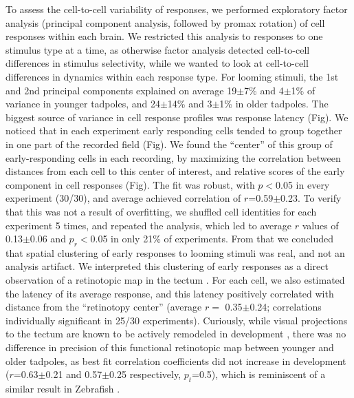 \documentclass{article}
\begin{document}
To assess the cell-to-cell variability of responses, we performed exploratory factor analysis (principal component analysis, followed by promax rotation) of cell responses within each brain. We restricted this analysis to responses to one stimulus type at a time, as otherwise factor analysis detected cell-to-cell differences in stimulus selectivity, while we wanted to look at cell-to-cell differences in dynamics within each response type. For looming stimuli, the 1st and 2nd principal components explained on average 19$\pm$7\% and 4$\pm$1\% of variance in younger tadpoles, and 24$\pm$14\% and 3$\pm$1\% in older tadpoles. The biggest source of variance in cell response profiles was response latency (Fig). We noticed that in each experiment early responding cells tended to group together in one part of the recorded field (Fig). We found the “center” of this group of early-responding cells in each recording, by maximizing the correlation between distances from each cell to this center of interest, and relative scores of the early component in cell responses (Fig). The fit was robust, with $p<$0.05 in every experiment (30/30), and average achieved correlation of $r$=0.59$\pm$0.23. To verify that this was not a result of overfitting, we shuffled cell identities for each experiment 5 times, and repeated the analysis, which led to average $r$ values of 0.13$\pm$0.06 and $p_r<$0.05 in only 21\% of experiments. From that we concluded that spatial clustering of early responses to looming stimuli was real, and not an analysis artifact. We interpreted this clustering of early responses as a direct observation of a retinotopic map in the tectum \citep{ruthazer2004map}. For each cell, we also estimated the latency of its average response, and this latency positively correlated with distance from the “retinotopy center” (average $r=$ 0.35$\pm$0.24; correlations individually significant in 25/30 experiments). Curiously, while visual projections to the tectum are known to be actively remodeled in development \citep{sakaguchi1985refinement,ruthazer2004map,munz2014hebbian}, there was no difference in precision of this functional retinotopic map between younger and older tadpoles, as best fit correlation coefficients did not increase in development ($r$=0.63$\pm$0.21 and 0.57$\pm$0.25 respectively, $p_t$=0.5), which is reminiscent of a similar result in Zebrafish \citep{avitan2016limitations}.
\end{document}
